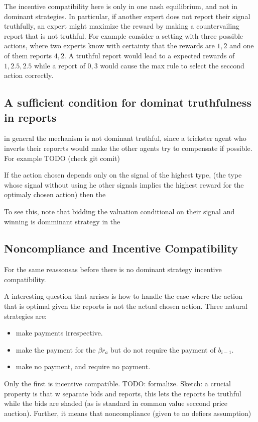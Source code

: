 The incentive compatibility here is only in one nash equilibrium, and not in dominant strategies. In particular, if another expert does not report their signal truthfully, an expert might maximize the reward by making a countervailing report that is not truthful. For example consider a setting with three possible actions, where two experts know with certainty that the rewards are $1,2$ and one of them reports $4,2$. A truthful report would lead to a expected rewards of $1,2.5,2.5$ while a report of $0,3$ would cause the max rule to select the seccond action correctly.


\subsection{A sufficient condition for dominat truthfulness in reports}

in general the mechanism is not dominant truthful, since a trickster agent who inverts their reporrts would make the other agents try to compensate if possible. For example TODO (check git comit) 

If the action chosen depends only on the signal of the highest type, (the type whose signal without using he other signals implies the highest reward for the optimaly chosen action) then the 

To see this, note that bidding the valuation conditional on their signal and winning is domminant strategy in the 

\subsection{Noncompliance and Incentive Compatibility}

For the same reassonsas before there is no dominant strategy incentive compatibility. 

A interesting question that arrises is how to handle the case where the action that is optimal given the reports is not the actual chosen action. Three natural strategies are:

\begin{itemize}
\item make payments irrespective.
\item make the payment for the $\beta r_a$ but do not require the payment of $b_{i-1}$.
\item make no payment, and require no payment.
\end{itemize}

Only the first is incentive compatible. TODO: formalize. Sketch: a crucial property is that w separate bids and reports, this lets the reports be truthful while the bids are shaded (as is standard in common value seccond price auction). Further, it means that noncompliance (given te no defiers assumption) 

